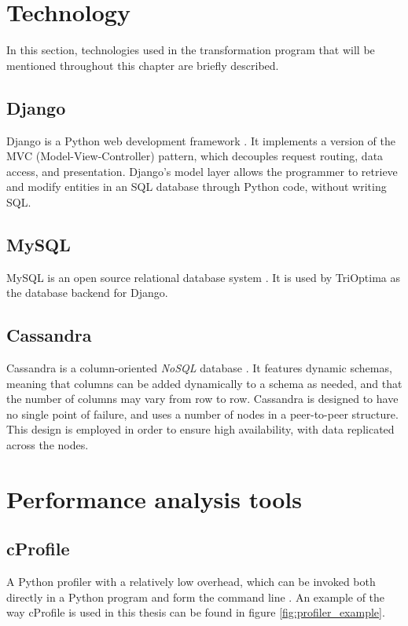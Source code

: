 \section{Technology}
In this section, technologies used in the transformation program that will be mentioned throughout this chapter are briefly described.

\subsection{Django}
Django is a Python web development framework \cite{holovaty_chapter_c1itd}. It implements a version of the MVC (Model-View-Controller) pattern, which decouples request routing, data access, and
presentation. Django's model layer allows the programmer to retrieve and modify entities in an SQL database through Python code, without writing SQL.

\subsection{MySQL}
MySQL is an open source relational database system \cite{what_wim}. It is used by TriOptima as the database backend for Django.

\subsection{Cassandra}
Cassandra is a column-oriented \textit{NoSQL} database \cite[p. 1-9]{mishra_2014_beginning_bacd}. It features dynamic schemas, meaning that columns can be added dynamically to a schema as needed, and that
the number of columns may vary from row to row. Cassandra is designed to have no single point of failure, and uses a number of nodes in a peer-to-peer structure. This design is
employed in order to ensure high availability, with data replicated across the nodes.

\section{Performance analysis tools}
\subsection{cProfile}
A Python profiler with a relatively low overhead, which can be invoked both directly in a Python program and form the command line \cite{26_2tppp2d}.
An example of the way cProfile is used in this thesis can be found in figure \ref{fig:profiler_example}.


